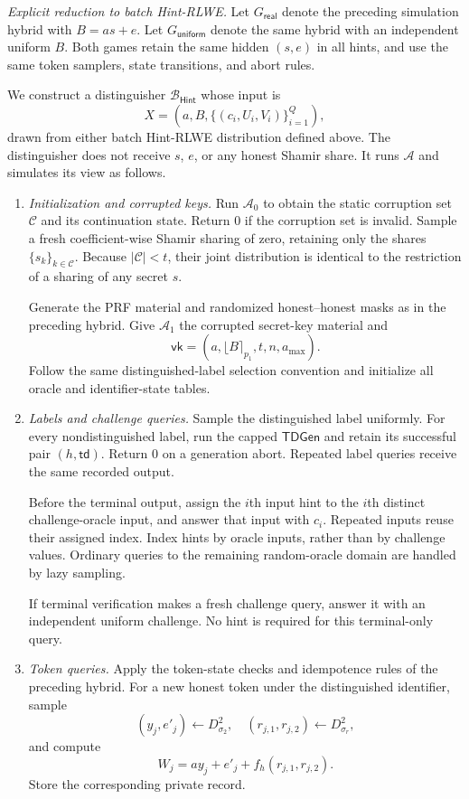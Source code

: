 \documentclass[lettersize,journal]{IEEEtran}
\begin{document}
\emph{Explicit reduction to batch Hint-RLWE.}
Let $G_{\mathsf{real}}$ denote the preceding simulation hybrid
with $B=as+e$.
Let $G_{\mathsf{uniform}}$ denote the same hybrid with an
independent uniform $B$.
Both games retain the same hidden $(s,e)$ in all hints,
and use the same token samplers, state transitions, and abort rules.

We construct a distinguisher $\mathcal B_{\mathsf{Hint}}$ whose input is
\[
X=\left(a,B,\{(c_i,U_i,V_i)\}_{i=1}^{Q}\right),
\]
drawn from either batch Hint-RLWE distribution defined above.
The distinguisher does not receive $s$, $e$, or any honest
Shamir share.
It runs $\mathcal A$ and simulates its view as follows.

\begin{enumerate}
\item \emph{Initialization and corrupted keys.}
Run $\mathcal A_0$ to obtain the static corruption set
$\mathcal C$ and its continuation state.
Return $0$ if the corruption set is invalid.
Sample a fresh coefficient-wise Shamir sharing of zero,
retaining only the shares $\{s_k\}_{k\in\mathcal C}$.
Because $|\mathcal C|<t$, their joint distribution is identical
to the restriction of a sharing of any secret $s$.

Generate the PRF material and randomized honest--honest masks
as in the preceding hybrid.
Give $\mathcal A_1$ the corrupted secret-key material and
\[
\mathsf{vk}=(a,\lfloor B\rceil_{p_1},t,n,a_{\max}).
\]
Follow the same distinguished-label selection convention
and initialize all oracle and identifier-state tables.

\item \emph{Labels and challenge queries.}
Sample the distinguished label uniformly.
For every nondistinguished label, run the capped
$\mathsf{TDGen}$ and retain its successful pair
$(h,\mathsf{td})$.
Return $0$ on a generation abort.
Repeated label queries receive the same recorded output.

Before the terminal output, assign the $i$th input hint
to the $i$th distinct challenge-oracle input,
and answer that input with $c_i$.
Repeated inputs reuse their assigned index.
Index hints by oracle inputs, rather than by challenge values.
Ordinary queries to the remaining random-oracle domain
are handled by lazy sampling.

If terminal verification makes a fresh challenge query,
answer it with an independent uniform challenge.
No hint is required for this terminal-only query.

\item \emph{Token queries.}
Apply the token-state checks and idempotence rules
of the preceding hybrid.
For a new honest token under the distinguished identifier,
sample
\[
(y_j,e'_j)\leftarrow D_{\sigma_2}^{2},
\quad
(r_{j,1},r_{j,2})\leftarrow D_{\sigma_r}^{2},
\]
and compute
\[
W_j=ay_j+e'_j+f_h(r_{j,1},r_{j,2}).
\]
Store the corresponding private record.


\end{enumerate}
\end{document}
